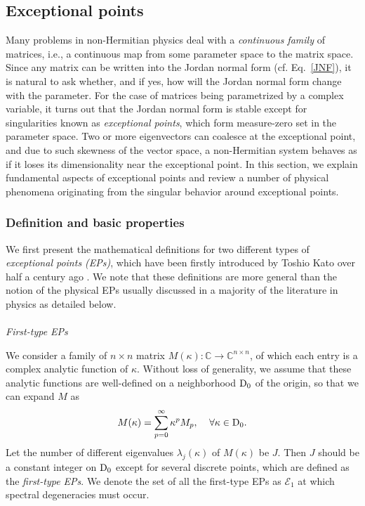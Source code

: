 \documentclass{tADP2e}
\theoremstyle{plain}
\theoremstyle{plain}
\theoremstyle{definition}
\begin{document}
\subsection{Exceptional points\label{Sec:EP}}
Many problems in non-Hermitian physics deal with a \emph{continuous family} of matrices, i.e., a continuous map from some parameter space to the matrix space. Since any matrix can be written into the Jordan normal form (cf. Eq.~\eqref{JNF}), it is natural to ask whether, and if yes, how will the Jordan normal form change with the parameter. For the case of matrices being parametrized by a complex variable, it turns out that the Jordan normal form is stable except for singularities known as \emph{exceptional points}, which form measure-zero set in the parameter space. Two or more eigenvectors can coalesce at the exceptional point, and due to such  skewness of the vector space, a non-Hermitian system behaves as if it loses its dimensionality near the exceptional point. In this section, we explain fundamental aspects of exceptional points and review a number of physical phenomena originating from the singular behavior around exceptional points. 

\subsubsection{Definition and basic properties\label{secepdef}}
We first present the mathematical definitions for two different types of  \emph{exceptional points (EPs)}, which have been firstly introduced by Toshio Kato over half a century ago \cite{TK80}. We note that these definitions are more general than the notion of the physical EPs usually discussed in a majority of the literature in physics as detailed below. 
\\
\\
{\it First-type EPs}

\vspace{3pt}
\noindent 
We consider a family of $n\times n$ matrix $M(\kappa): \mathbb{C}\to\mathbb{C}^{n\times n}$, of which each entry is a complex analytic function of $\kappa$. Without loss of generality, we assume that these analytic functions are well-defined on a neighborhood ${\rm D}_0$ of the origin, so that we can expand $M$ as
\begin{equation}
M(\kappa)=\sum^\infty_{p=0} \kappa^p M_p,\;\;\;\;\forall\kappa\in{\rm D}_0.
\end{equation}
Let the number of different eigenvalues $\lambda_j(\kappa)$ of $M(\kappa)$ be $J$. Then $J$ should be a constant integer on ${\rm D}_0$ except for several discrete points, which are defined as the \emph{first-type EPs}. We denote the set of all the first-type EPs as $\mathscr{E}_1$ at which spectral degeneracies must occur.  
\end{document}
